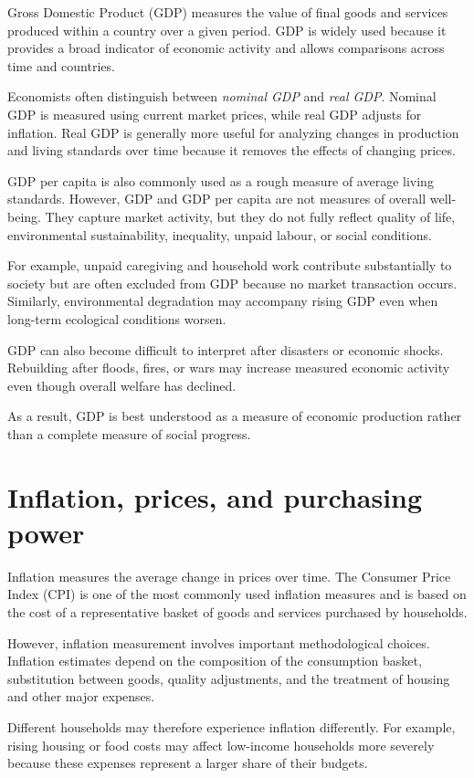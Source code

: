 \documentclass[
  11pt,
  oneside]{book}
\begin{document}
Gross Domestic Product (GDP) measures the value of final goods and services produced within a country over a given period. GDP is widely used because it provides a broad indicator of economic activity and allows comparisons across time and countries.

Economists often distinguish between \emph{nominal GDP} and \emph{real GDP}. Nominal GDP is measured using current market prices, while real GDP adjusts for inflation. Real GDP is generally more useful for analyzing changes in production and living standards over time because it removes the effects of changing prices.

GDP per capita is also commonly used as a rough measure of average living standards. However, GDP and GDP per capita are not measures of overall well-being. They capture market activity, but they do not fully reflect quality of life, environmental sustainability, inequality, unpaid labour, or social conditions.

For example, unpaid caregiving and household work contribute substantially to society but are often excluded from GDP because no market transaction occurs. Similarly, environmental degradation may accompany rising GDP even when long-term ecological conditions worsen.

GDP can also become difficult to interpret after disasters or economic shocks. Rebuilding after floods, fires, or wars may increase measured economic activity even though overall welfare has declined.

As a result, GDP is best understood as a measure of economic production rather than a complete measure of social progress.

\section{Inflation, prices, and purchasing power}\label{inflation-prices-and-purchasing-power}

Inflation measures the average change in prices over time. The Consumer Price Index (CPI) is one of the most commonly used inflation measures and is based on the cost of a representative basket of goods and services purchased by households.

However, inflation measurement involves important methodological choices. Inflation estimates depend on the composition of the consumption basket, substitution between goods, quality adjustments, and the treatment of housing and other major expenses.

Different households may therefore experience inflation differently. For example, rising housing or food costs may affect low-income households more severely because these expenses represent a larger share of their budgets.
\end{document}
